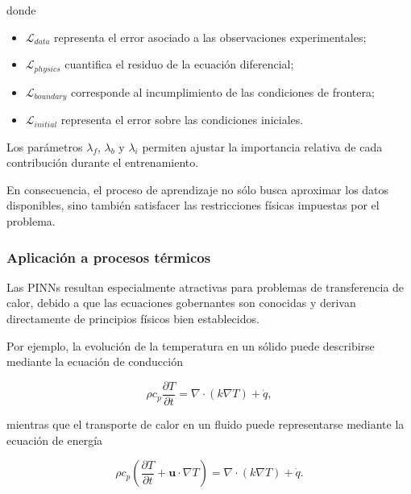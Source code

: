 donde

\begin{itemize}

\item $\mathcal{L}_{data}$ representa el error asociado a las observaciones experimentales;

\item $\mathcal{L}_{physics}$ cuantifica el residuo de la ecuación diferencial;

\item $\mathcal{L}_{boundary}$ corresponde al incumplimiento de las condiciones de frontera;

\item $\mathcal{L}_{initial}$ representa el error sobre las condiciones iniciales.

\end{itemize}

Los parámetros $\lambda_f$, $\lambda_b$ y $\lambda_i$ permiten ajustar la importancia relativa de cada contribución durante el entrenamiento.

En consecuencia, el proceso de aprendizaje no sólo busca aproximar los datos disponibles, sino también satisfacer las restricciones físicas impuestas por el problema.

\subsubsection{Aplicación a procesos térmicos}

Las PINNs resultan especialmente atractivas para problemas de transferencia de calor, debido a que las ecuaciones gobernantes son conocidas y derivan directamente de principios físicos bien establecidos.

Por ejemplo, la evolución de la temperatura en un sólido puede describirse mediante la ecuación de conducción

\begin{equation}
\rho c_p
\frac{\partial T}{\partial t}
=
\nabla\cdot
(k\nabla T)
+\dot q,
\end{equation}

mientras que el transporte de calor en un fluido puede representarse mediante la ecuación de energía

\begin{equation}
\rho c_p
\left(
\frac{\partial T}{\partial t}
+\mathbf{u}\cdot\nabla T
\right)
=
\nabla\cdot(k\nabla T)
+\dot q.
\end{equation}

